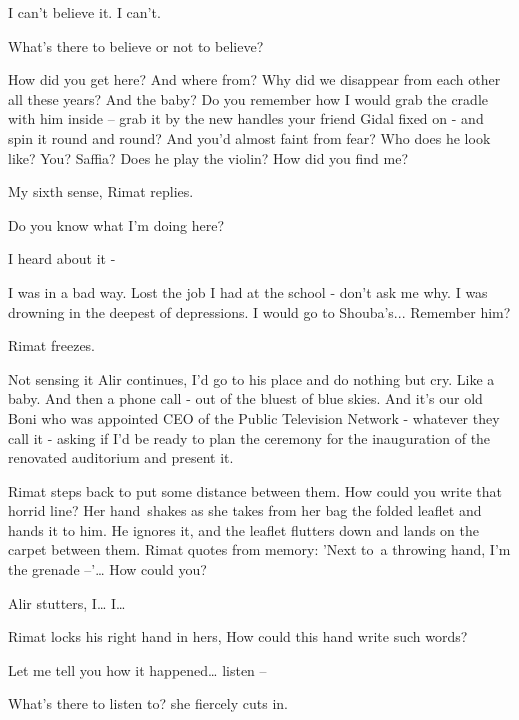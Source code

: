 \documentclass[letterpaper]{article}
\begin{document}
{\textquotedbl}I can't believe it. I can't.{\textquotedbl} 

{\textquotedbl}What's there to believe or not to believe?{\textquotedbl} 

{\textquotedbl}How did you get here? And where from? Why did we disappear from each other all these years? And the baby?
Do you remember how I would grab the cradle with him inside -- grab it by the new handles your friend Gidal
fixed\textcolor[rgb]{0.8901961,0.42352942,0.039215688}{ }on\textcolor[rgb]{0.8901961,0.42352942,0.039215688}{ }{}- and
spin it round and round? And you'd almost faint from fear? Who does he look like? You? Saffia? Does he play the violin?
How did you find me?{\textquotedbl} 

{\textquotedbl}My sixth sense,{\textquotedbl} Rimat replies. 

{\textquotedbl}Do you know what I'm doing here?{\textquotedbl} 

{\textquotedbl}I heard about it -{\textquotedbl}

{\textquotedbl}I was in a bad way. Lost the job I had at the school - don't ask me why. I was drowning in the deepest of
depressions. I would go to Shouba's... Remember him?{\textquotedbl}

Rimat freezes.

Not sensing it Alir continues, {\textquotedbl}I'd go to his place and do nothing but cry. Like a baby. And then a phone
call - out of the bluest of blue skies. And it's our old Boni who was appointed CEO of the Public Television Network -
whatever they call it - asking if I'd be ready to plan the ceremony for the inauguration of the renovated auditorium
and present it.{\textquotedbl} 

Rimat steps back to put some distance between them. {\textquotedbl}How could you write that horrid line?{\textquotedbl}
Her hand~shakes as she takes from her bag the folded leaflet and hands it to him. He ignores it, and the leaflet
flutters down and lands on the carpet between them. Rimat quotes from memory: {\textquotedbl}'Next to~a throwing hand,
I'm the grenade --'{\dots} How could you?{\textquotedbl} 

Alir stutters, {\textquotedbl}I{\dots} I{\dots}{\textquotedbl} 

Rimat locks his right hand in hers, {\textquotedbl}How could this hand write such words?{\textquotedbl} 

{\textquotedbl}Let me tell you how it happened{\dots} listen -- {\textquotedbl} 

{\textquotedbl}What's there to listen to?{\textquotedbl} she fiercely cuts in.
\end{document}
